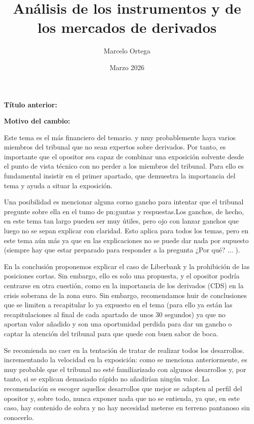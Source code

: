 \documentclass[10pt,a4paper]{article}
\title{Análisis de los instrumentos y de los mercados de derivados\\
\large }
\author{Marcelo Ortega}
\date{Marzo 2026}
\newcommand{\puntosclave}[1]{%
  \begin{tcolorbox}[
    colframe=black,
    title={Puntos clave},
    before upper={\setlength{\parindent}{0.5cm}\setlength{\parskip}{0.5\baselineskip}}
  ]
  #1
  \end{tcolorbox}
}
\newcommand{\changebox}{%
\begin{tcolorbox}[title={Historial de cambios del tema}]
\textbf{Título anterior:} \OldTitle\par
\textbf{Motivo del cambio:} \ChangeWhy
\end{tcolorbox}
}
\begin{document}
\maketitle
\changebox

\newpage

\puntosclave{ %
     Este tema es el más financiero del temario. y muy probablemente haya varios miembros del tribunal que no sean expertos sobre derivados. Por tanto, es importante que el opositor sea capaz de combinar una exposición solvente desde el punto de vista técnico con no perder a los miembros del tribunal. Para ello es fundamental insistir en el primer apartado, que demuestra la importancia del tema y ayuda a situar la exposición.

     Una posibilidad es mencionar alguna corno gancho para intentar que el tribunal pregunte sobre ella en el tumo de pn:guntas y respuestas.Los ganchos, de hecho, en este tema tan largo pueden ser muy útiles, pero ojo con lanzar ganchos que luego no se sepan explicar con claridad. Esto aplica para todos los temas, pero en este tema aún más ya que en las explicaciones no se puede dar nada por supuesto (siempre hay que estar preparado para responder a la pregunta ¿Por qué? ... ).

     En la conclusión proponemos explicar el caso de Liberbank y la prohibición de las posiciones cortas. Sin embargo, ello es solo una propuesta, y el opositor podría centrarse en otra cuestión, como en la importancia de los derivados (CDS) en la crisis soberana de la zona euro. Sin embargo, recomendamos huir de conclusiones que se limiten a recapitular lo ya expuesto en el tema (para ello ya están las recapitulaciones al final de cada apartado de unos 30 segundos) ya que no aportan valor añadido y son una oportunidad perdida para dar un gancho o captar la atención del tribunal para que quede con buen sabor de boca.

     Se recomienda no caer en la tentación de tratar de realizar todos los desarrollos. incrementando la velocidad en la exposición: como se menciona anteriormente, es muy probable que el tribunal no esté familiarizado con algunos desarrollos y, por tanto, si se explican demasiado rápido no añadirían ningún valor. La recomendación es escoger aquellos desarrollos que mejor se adapten al perfil del opositor y, sobre todo, nunca exponer nada que no se entienda, ya que, en este caso, hay contenido de sobra y no hay necesidad meterse en terreno pantanoso sin conocerlo.
    }
\vspace{1cm}
\end{document}
